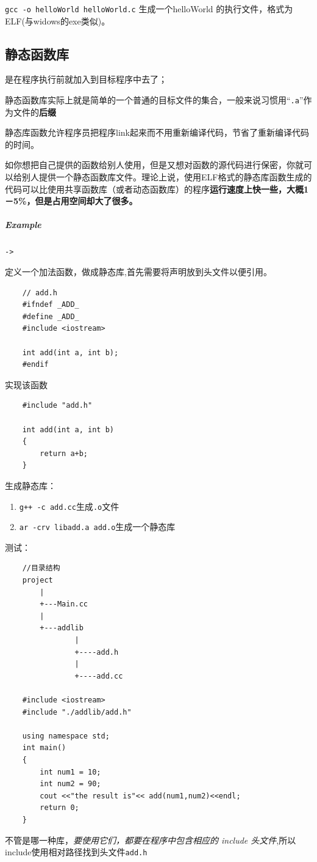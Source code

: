 \documentclass[UTF8,a4paper,12pt]{ctexbook}
\begin{document}
			\verb|gcc -o helloWorld helloWorld.c| 生成一个helloWorld 的执行文件，格式为ELF(与widows的exe类似)。
			
		\subsection{静态函数库}是在程序执行前就加入到目标程序中去了；
		
			静态函数库实际上就是简单的一个普通的目标文件的集合，一般来说习惯用“\verb|.a|”作为文件的\textbf{后缀}
			
			静态库函数允许程序员把程序link起来而不用重新编译代码，节省了重新编译代码的时间。
			
			如你想把自己提供的函数给别人使用，但是又想对函数的源代码进行保密，你就可以给别人提供一个静态函数库文件。理论上说，使用ELF格式的静态库函数生成的代码可以比使用共享函数库（或者动态函数库）的程序\textbf{运行速度上快一些，大概1－5\%，但是占用空间却大了很多。}
			
			\subparagraph{Example}\verb|->|
				
				定义一个加法函数，做成静态库,首先需要将声明放到头文件以便引用。
				\begin{lstlisting}
	// add.h
	#ifndef _ADD_
	#define _ADD_
	#include <iostream>
	
	int add(int a, int b);
	#endif
				\end{lstlisting}
				
				实现该函数
				\begin{lstlisting}
	#include "add.h"
	
	int add(int a, int b)
	{
		return a+b;
	}
				\end{lstlisting}
			
				生成静态库：
				\begin{enumerate}[itemindent = 2em]
					\item \verb|g++ -c add.cc|生成\verb|.o|文件
					\item \verb|ar -crv libadd.a add.o|生成一个静态库
				\end{enumerate}
				
				
				测试：
				\begin{lstlisting}
	//目录结构
	project
		|
		+---Main.cc
		|
		+---addlib
				|
				+----add.h
				|
				+----add.cc
	
	#include <iostream>
	#include "./addlib/add.h"
	
	using namespace std;
	int main()
	{
		int num1 = 10;
		int num2 = 90;
		cout <<"the result is"<< add(num1,num2)<<endl;
		return 0;
	}
				\end{lstlisting}
				不管是哪一种库，\textit{要使用它们，都要在程序中包含相应的 include 头文件},所以include使用相对路径找到头文件\verb|add.h|
				
\end{document}
